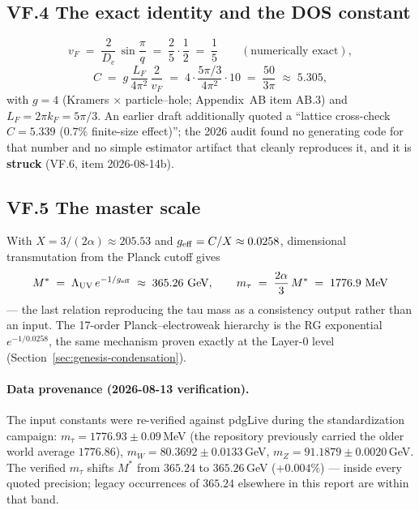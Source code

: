 \subsection*{VF.4 The exact identity and the DOS constant}
\begin{equation}
v_F \;=\; \frac{2}{D_e}\,\sin\frac{\pi}{q} \;=\; \frac{2}{5}\cdot\frac{1}{2} \;=\; \frac{1}{5}
\qquad(\text{numerically exact}),
\end{equation}
\begin{equation}
C \;=\; g\,\frac{L_F}{4\pi^2}\,\frac{2}{v_F}
\;=\; 4\cdot\frac{5\pi/3}{4\pi^2}\cdot 10 \;=\; \frac{50}{3\pi}\;\approx\;5.305,
\end{equation}
with $g=4$ (Kramers $\times$ particle--hole; Appendix~AB item AB.3) and $L_F=2\pi k_F=5\pi/3$.
An earlier draft additionally quoted a ``lattice cross-check $C=5.339$ ($0.7\%$ finite-size
effect)''; the 2026 audit found no generating code for that number and no simple estimator
artifact that cleanly reproduces it, and it is \textbf{struck} (VF.6, item 2026-08-14b).

\subsection*{VF.5 The master scale}
With $X=3/(2\alpha)\approx205.53$ and $g_{\rm eff}=C/X\approx0.0258$, dimensional
transmutation from the Planck cutoff gives
\begin{equation}
M^{*} \;=\; \Lambda_{\rm UV}\, e^{-1/g_{\rm eff}} \;\approx\; 365.26\ \text{GeV},
\qquad
m_\tau \;=\; \frac{2\alpha}{3}\,M^{*} \;=\; 1776.9\ \text{MeV}
\end{equation}
--- the last relation reproducing the tau mass as a consistency output rather than an input.
The 17-order Planck--electroweak hierarchy is the RG exponential $e^{-1/0.0258}$, the same
mechanism proven exactly at the Layer-0 level (Section~\ref{sec:genesis-condensation}).


\paragraph{Data provenance (2026-08-13 verification).} The input constants were
re-verified against pdgLive during the standardization campaign:
$m_\tau = 1776.93\pm0.09$\,MeV (the repository previously carried the older world average
$1776.86$), $m_W = 80.3692\pm0.0133$\,GeV, $m_Z = 91.1879\pm0.0020$\,GeV. The verified
$m_\tau$ shifts $M^{*}$ from $365.24$ to $365.26$\,GeV ($+0.004\%$) --- inside every quoted
precision; legacy occurrences of $365.24$ elsewhere in this report are within that band.

